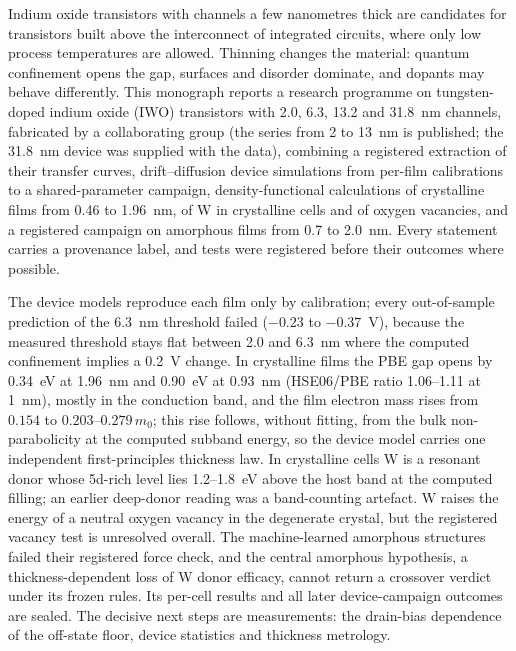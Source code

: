 Indium oxide transistors with channels a few nanometres thick are candidates for transistors built above the
interconnect of integrated circuits, where only low process temperatures are allowed. Thinning changes the material:
quantum confinement opens the gap, surfaces and disorder dominate, and dopants may behave differently. This monograph
reports a research programme on tungsten-doped indium oxide (IWO) transistors with 2.0, 6.3, 13.2 and 31.8~nm channels,
fabricated by a collaborating group (the series from 2 to 13~nm is published; the 31.8~nm device was supplied with the
data), combining a registered extraction of their transfer curves,
drift--diffusion device simulations from per-film calibrations to a shared-parameter campaign, density-functional
calculations of crystalline \InO{} films from 0.46 to 1.96~nm, of W in crystalline cells and of oxygen vacancies, and a
registered campaign on amorphous films from 0.7 to 2.0~nm. Every statement carries a provenance label, and tests were
registered before their outcomes where possible.

The device models reproduce each film only by calibration; every out-of-sample prediction of the 6.3~nm threshold failed
($-0.23$ to $-0.37$~V), because the measured threshold stays flat between 2.0 and 6.3~nm where the computed confinement
implies a 0.2~V change. In crystalline films the PBE gap opens by 0.34~eV at 1.96~nm and 0.90~eV at 0.93~nm (HSE06/PBE
ratio 1.06--1.11 at 1~nm), mostly in the conduction band, and the film electron mass rises from $0.154$ to
$0.203$--$0.279\,m_0$; this rise follows, without fitting, from the bulk non-parabolicity at the computed subband energy,
so the device model carries one independent first-principles thickness law. In crystalline cells W is a resonant donor
whose 5d-rich level lies 1.2--1.8~eV above the host band at the computed filling; an earlier deep-donor reading was a
band-counting artefact. W raises the energy of a neutral oxygen vacancy in the degenerate crystal, but the registered
vacancy test is unresolved overall. The machine-learned amorphous structures failed their registered force check, and
the central amorphous hypothesis, a thickness-dependent loss of W donor efficacy, cannot return a crossover verdict under
its frozen rules. Its per-cell results and all later device-campaign outcomes are sealed. The decisive next steps are
measurements: the drain-bias dependence of the off-state floor, device statistics and thickness metrology.
